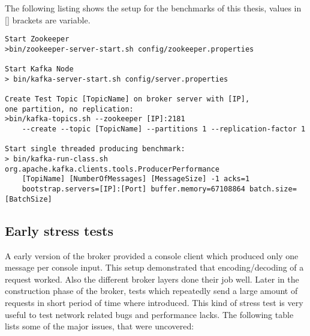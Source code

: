The following listing shows the setup for the benchmarks of this thesis,
values in [] brackets are variable. 
\begin{verbatim}
Start Zookeeper
>bin/zookeeper-server-start.sh config/zookeeper.properties

Start Kafka Node 
> bin/kafka-server-start.sh config/server.properties

Create Test Topic [TopicName] on broker server with [IP], 
one partition, no replication: 
>bin/kafka-topics.sh --zookeeper [IP]:2181 
    --create --topic [TopicName] --partitions 1 --replication-factor 1

Start single threaded producing benchmark: 
> bin/kafka-run-class.sh org.apache.kafka.clients.tools.ProducerPerformance 
    [TopiName] [NumberOfMessages] [MessageSize] -1 acks=1 
    bootstrap.servers=[IP]:[Port] buffer.memory=67108864 batch.size=[BatchSize]
\end{verbatim}




\newpage
\subsection{Early stress tests}
A early version of the broker provided a console client which produced only one
message per console input. This setup demonstrated that encoding/decoding of a
request worked. Also the different broker layers done their job well.
Later in the construction phase of the broker, tests which repeatedly send
a large amount of requests in short period of time where introduced. This kind
of stress test is very useful to test network related bugs and performance
lacks. The following table lists some of the major issues, that were uncovered: 


